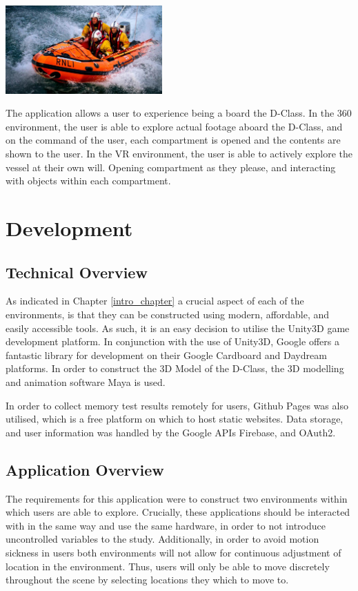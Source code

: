 \documentclass[a4paper, openright, twoside]{book}
\begin{document}
\begin{minipage}{\textwidth}
\hfill \break
\centering
\includegraphics[width=0.45\textwidth]{images/d-class}
\label{dclass}
\hfill \break
\end{minipage}

The application allows a user to experience being a board the D-Class. In the 360 environment, the user is able to explore actual footage aboard the D-Class, and on the command of the user, each compartment is opened and the contents are shown to the user. In the VR environment, the user is able to actively explore the vessel at their own will. Opening compartment as they please, and interacting with objects within each compartment. 

\chapter{Development}

\section{Technical Overview}
As indicated in Chapter \ref{intro_chapter} a crucial aspect of each of the environments, is that they can be constructed using modern, affordable, and easily accessible tools. As such, it is an easy decision to utilise the Unity3D game development platform. In conjunction with the use of Unity3D, Google offers a fantastic library for development on their Google Cardboard and Daydream platforms. In order to construct the 3D Model of the D-Class, the 3D modelling and animation software Maya is used. 

In order to collect memory test results remotely for users, Github Pages was also utilised, which is a free platform on which to host static websites. Data storage, and user information was handled by the Google APIs Firebase, and OAuth2.

\section{Application Overview}
The requirements for this application were to construct two environments within which users are able to explore. Crucially, these applications should be interacted with in the same way and use the same hardware, in order to not introduce uncontrolled variables to the study. Additionally, in order to avoid motion sickness in users both environments will not allow for continuous adjustment of location in the environment. Thus, users will only be able to move discretely throughout the scene by selecting locations they which to move to. 
\end{document}
